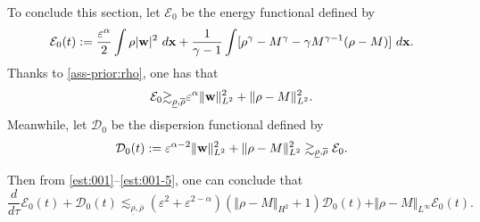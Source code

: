 \documentclass[11pt]{article}
\theoremstyle{plain}
\theoremstyle{definition}
\theoremstyle{remark}
\renewcommand{\vec}[1]{{\bf #1}}
\newcommand{\idx}{\ d\vec x}
\newcommand{\norm}[2]{\Vert #1 \Vert_{#2}}
\numberwithin{equation}{section}
\begin{document}
\smallskip

To conclude this section, let $ \mathcal E_0 $ be the energy functional defined by
\begin{equation}
    \label{def:e-0}
    \mathcal E_0(t):= \frac{\varepsilon^\alpha}{2} \int \rho \vert \vec w \vert^2 \idx + \frac{1}{\gamma-1} \int \lbrack \rho^\gamma - M^\gamma - \gamma M^{\gamma-1} (\rho - M) \rbrack \idx.
\end{equation}
Thanks to \eqref{ass-prior:rho}, one has that
\begin{equation}
    \label{est:003}
    \mathcal E_0 {\gtrsim}_{\underline \rho, \overline \rho}   \varepsilon^{\alpha} \norm{\vec w}{L^2}^2 + \norm{\rho - M}{L^2}^2. 
\end{equation}
Meanwhile, let $ \mathcal D_0 $ be the dispersion functional defined by
\begin{equation}
    \label{def:d-0}
    \mathcal D_0(t) := \varepsilon^{\alpha-2} \norm{\vec w}{L^2}^2 + \norm{\rho - M}{L^2}^2 \gtrsim_{\underline \rho, \overline \rho} \mathcal E_0.
\end{equation}

Then from \eqref{est:001}--\eqref{est:001-5}, one can conclude that
\begin{equation}
    \label{ene:004}
    \dfrac{d}{d\tau} \mathcal  E_0(t) + \mathcal D_0(t) \lesssim_{\underline\rho, \overline\rho}  (\varepsilon^2 + \varepsilon^{2-\alpha}) (\norm{\rho - M}{H^2} + 1) \mathcal D_0(t) + \norm{\rho-M}{L^\infty} \mathcal E_0(t). %
\end{equation}
\end{document}

